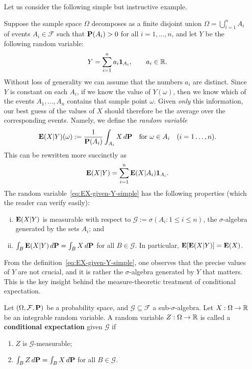 Let us consider the following simple but instructive example. 
\begin{example}
\label{exam:condex-simple}
Suppose the sample space $\Omega$ decomposes as a finite disjoint union $\Omega=\bigcup_{i=1}^n A_i$ of events $A_i\in\mathcal{F}$ such that $\mathbf{P}(A_i)>0$ for all $i=1,\ldots,n$, and let $Y$ be the following random variable:
\begin{equation*}
    Y = \sum_{i=1}^n a_i \mathbf{1}_{A_i}, \qquad a_i\in\mathbb{R}.
\end{equation*}
Without loss of generality we can assume that the numbers $a_i$ are distinct. Since $Y$ is constant on each $A_i$, if we know the value of $Y(\omega)$, then we know which of the events $A_1,\ldots, A_n$ contains that sample point $\omega$. Given \emph{only} this information, our best guess of the values of $X$ should therefore be the average over the corresponding events. Namely, we define the \emph{random variable}
\begin{equation}
\label{eq:EX-given-Y-simple}
    \mathbf{E}(X|Y)(\omega) := \frac{1}{\mathbf{P}(A_i)}\int_{A_i} X\,d\mathbf{P} \quad\text{for }\omega\in A_i \quad (i=1\ldots, n).
\end{equation}
This can be rewritten more succinctly as
\begin{equation*}
    \mathbf{E}(X|Y) = \sum_{i=1}^n \mathbf{E}(X|A_i)\mathbf{1}_{A_i}.
\end{equation*}
The random variable~\eqref{eq:EX-given-Y-simple} has the following properties (which the reader can verify easily):
\begin{enumerate}[(i)]
    \item $\mathbf{E}(X|Y)$ is measurable with respect to $\mathcal{G}:=\sigma(A_i:1\le i\le n)$, the $\sigma$-algebra generated by the sets $A_i$; and
    \item $\int_B \mathbf{E}(X|Y)\,d\mathbf{P} = \int_B X\,d\mathbf{P}$ for all $B\in\mathcal{G}$. In particular, $\mathbf{E}[\mathbf{E}(X|Y)] = \mathbf{E}(X)$.
\end{enumerate}
\end{example}

From the definition~\eqref{eq:EX-given-Y-simple}, one observes that the precise values of $Y$ are not crucial, and it is rather the $\sigma$-algebra generated by $Y$ that matters. This is the key insight behind the measure-theoretic treatment of conditional expectation.
\begin{definition}
\label{def:condex}
Let $(\Omega, \mathcal{F}, \mathbf{P})$ be a probability space, and $\mathcal{G} \subseteq\mathcal{F}$ a sub-$\sigma$-algebra. Let $X:\Omega\to\mathbb{R}$ be an integrable random variable. A random variable $Z:\Omega\to\mathbb{R}$ is called a \textbf{conditional expectation} given $\mathcal{G}$ if
\begin{enumerate}[\upshape (i)]
    \item $Z$ is $\mathcal{G}$-measurable;
    \item $\int_B Z\,d\mathbf{P} = \int_B X\,d\mathbf{P}$ for all $B\in\mathcal{G}$.
\end{enumerate}
\end{definition}

